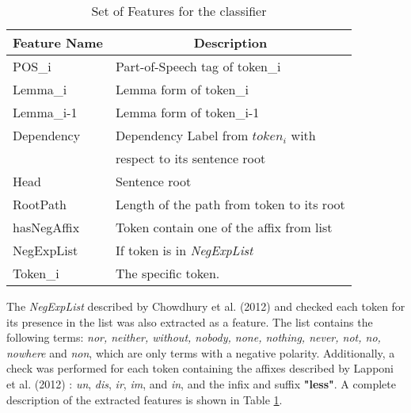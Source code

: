 \begin{table}
\centering
\caption{\label{tab:features} Set of Features for the classifier}
\begin{tabular}{ll}
\hline
\multicolumn{1}{c}{\textbf{Feature Name}} & \multicolumn{1}{c}{\textbf{Description}}                                                                                              \\ 
\hline
POS_i                                                 & Part-of-Speech tag of token_i\\
Lemma_i                                               & Lemma form of token_i\\
Lemma_{i-1}                                           & Lemma form of token_{i-1}\\
Dependency                                            & Dependency Label from $token_{i}$ with\\& respect to its sentence root \\
Head                                                  & Sentence root\\
RootPath                                              & Length of the path from token to its root\\
hasNegAffix                                           & Token contain one of the affix from list \\
NegExpList                                            & If token is in \textit{NegExpList} \\

Token_{i} & The specific token. \\
\hline
\end{tabular}
\end{table}


The \textit{NegExpList} described by Chowdhury et al. (2012) \cite{chowdhury2012fbk} and checked each token for its presence in the list was also extracted as a feature. The list contains the following terms: \textit{nor, neither, without, nobody, none, nothing, never, not, no, nowhere} and  \textit{non}, which are only terms with a negative polarity. Additionally, a check was performed for each token containing the affixes described by Lapponi et al. (2012) \cite{lapponi2012uio}: \textit{un}, \textit{dis}, \textit{ir}, \textit{im}, and \textit{in}, and the infix and suffix \textbf{"less"}. A complete description of the extracted features is shown in Table \ref{tab:features}.
